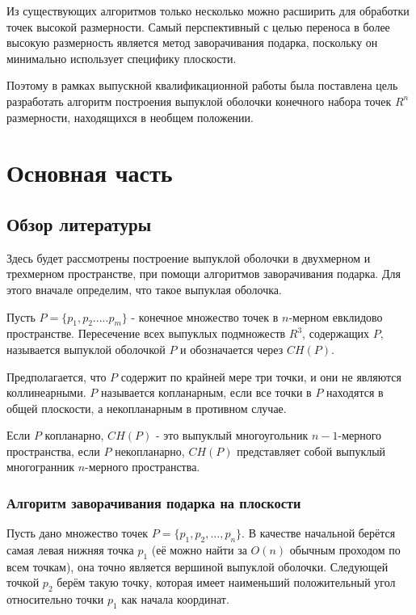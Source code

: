 \documentclass[a4paper,14pt]{extarticle}  %
\begin{document}
Из существующих алгоритмов только несколько можно расширить для обработки точек высокой размерности.
Самый перспективный с целью переноса в более высокую размерность является метод заворачивания подарка, поскольку он минимально использует специфику плоскости.


Поэтому в рамках выпускной квалификационной работы была поставлена цель разработать алгоритм построения выпуклой оболочки конечного набора точек $R^n$ размерности, находящихся в необщем положении.

\newpage
\section{Основная часть}
\subsection{Обзор литературы}
Здесь будет рассмотрены построение выпуклой оболочки в двухмерном и трехмерном пространстве, при помощи алгоритмов заворачивания подарка.
Для этого вначале определим, что такое выпуклая оболочка.

Пусть $P = \{p_1, p_2 ..... p_m\}$ - конечное множество точек в $n$-мерном евклидово пространстве.
Пересечение всех выпуклых подмножеств $R^3$, содержащих $P$, называется выпуклой оболочкой $P$ и обозначается через $CH(P)$.\cite{bib:kokichi}

Предполагается, что $P$ содержит по крайней мере три точки, и они не являются коллинеарными.
$P$ называется копланарным, если все точки в $P$ находятся в общей плоскости, а некопланарным в противном случае.

Если $P$ копланарно, $CH(P)$ - это выпуклый многоугольник $n-1$-мерного пространства, если $P$ некопланарно, $CH(P)$ представляет собой выпуклый многогранник $n$-мерного пространства.


\subsubsection{Алгоритм заворачивания подарка на плоскости}\label{sec:ch2}

Пусть дано множество точек $P=\{p_1,p_2,\ldots,p_n\}$. В качестве начальной берётся самая левая нижняя точка $p_1$ (её можно найти за $O(n)$ обычным проходом по всем точкам), она точно является вершиной выпуклой оболочки. Следующей точкой $p_2$ берём такую точку, которая имеет наименьший положительный угол относительно точки $p_1$ как начала координат.
\end{document}
